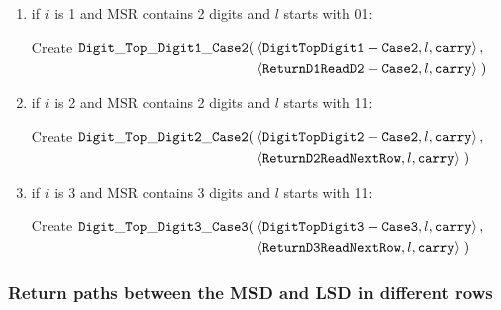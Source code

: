 \begin{itemize}
\begin{enumerate}[label=\alph*)]
                \item if $i$ is 1 and MSR contains 2 digits and $l$ starts with 01:

                Create
                $\begin{aligned}[t]
                    {\tt Digit\_Top\_Digit1\_Case2}(& \left \langle {\tt DigitTopDigit1-Case2}, l, {\tt carry} \right\rangle, & \\
                                     & \left \langle {\tt ReturnD1ReadD2-Case2}, l, {\tt carry} \right\rangle \;)
                \end{aligned}$
                \vspace{.5cm}


                \item if $i$ is 2 and MSR contains 2 digits and $l$ starts with 11:

                Create
                $\begin{aligned}[t]
                    {\tt Digit\_Top\_Digit2\_Case2}(& \left \langle {\tt DigitTopDigit2-Case2}, l, {\tt carry} \right\rangle, & \\
                                     & \left \langle {\tt ReturnD2ReadNextRow},  l,   {\tt carry} \right\rangle \;)
                \end{aligned}$
                \vspace{.5cm}


                \item if $i$ is 3 and MSR contains 3 digits and $l$ starts with 11:

                Create
                $\begin{aligned}[t]
                    {\tt Digit\_Top\_Digit3\_Case3}(& \left \langle {\tt DigitTopDigit3-Case3}, l, {\tt carry} \right\rangle, & \\
                                         & \left \langle {\tt ReturnD3ReadNextRow},  l, {\tt carry} \right\rangle \;)
                \end{aligned}$
                \vspace{.5cm}


            \end{enumerate}

        \end{itemize}
    \vspace{1cm}



    \subsubsection{Return paths between the MSD and LSD in different rows}

